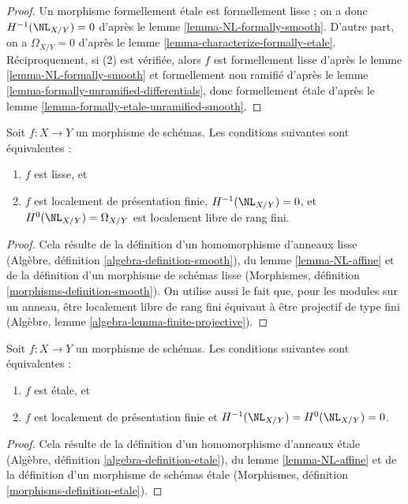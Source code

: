 \begin{proof}
Un morphisme formellement étale est formellement lisse ; on a donc
$H^{-1}(\NL_{X/Y}) = 0$ d'après le lemme \ref{lemma-NL-formally-smooth}.
D'autre part, on a $\Omega_{X/Y} = 0$ d'après
le lemme \ref{lemma-characterize-formally-etale}.
Réciproquement, si (2) est vérifiée, alors $f$ est formellement lisse d'après
le lemme \ref{lemma-NL-formally-smooth}
et formellement non ramifié d'après
le lemme \ref{lemma-formally-unramified-differentials},
donc formellement étale d'après
le lemme \ref{lemma-formally-etale-unramified-smooth}.
\end{proof}

\begin{lemma}
\label{lemma-NL-smooth}
Soit $f : X \to Y$ un morphisme de schémas. Les conditions suivantes sont équivalentes :
\begin{enumerate}
\item $f$ est lisse, et
\item $f$ est localement de présentation finie,
$H^{-1}(\NL_{X/Y}) = 0$, et $H^0(\NL_{X/Y}) = \Omega_{X/Y}$
est localement libre de rang fini.
\end{enumerate}
\end{lemma}

\begin{proof}
Cela résulte de la définition d'un homomorphisme d'anneaux lisse
(Algèbre, définition \ref{algebra-definition-smooth}),
du lemme \ref{lemma-NL-affine} et
de la définition d'un morphisme de schémas lisse
(Morphismes, définition \ref{morphisms-definition-smooth}).
On utilise aussi le fait que, pour les modules sur un anneau,
être localement libre de rang fini équivaut à être projectif de type fini
(Algèbre, lemme \ref{algebra-lemma-finite-projective}).
\end{proof}

\begin{lemma}
\label{lemma-NL-etale}
Soit $f : X \to Y$ un morphisme de schémas. Les conditions suivantes sont équivalentes :
\begin{enumerate}
\item $f$ est étale, et
\item $f$ est localement de présentation finie et
$H^{-1}(\NL_{X/Y}) = H^0(\NL_{X/Y}) = 0$.
\end{enumerate}
\end{lemma}

\begin{proof}
Cela résulte de la définition d'un homomorphisme d'anneaux étale
(Algèbre, définition \ref{algebra-definition-etale}),
du lemme \ref{lemma-NL-affine} et
de la définition d'un morphisme de schémas étale
(Morphismes, définition \ref{morphisms-definition-etale}).
\end{proof}


